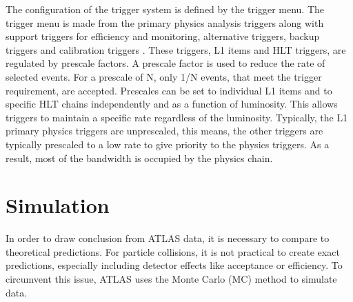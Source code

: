 \indent The configuration of the trigger system is defined by the trigger menu. The trigger menu is made from the primary physics analysis triggers along with support triggers for efficiency and monitoring, alternative triggers, backup triggers and calibration triggers \cite{zurNedden:2238679}. These triggers, L1 items and HLT triggers, are regulated by prescale factors. A prescale factor is used to reduce the rate of selected events. For a prescale of N, only 1/N events, that meet the trigger requirement, are accepted. Prescales can be set to individual L1 items and to specific HLT chains independently and as a function of luminosity. This allows triggers to maintain a specific rate regardless of the luminosity. Typically, the L1 primary physics triggers are unprescaled, this means, the other triggers are typically prescaled to a low rate to give priority to the physics triggers. As a result, most of the bandwidth is occupied by the physics chain. \linebreak
\section{Simulation}
In order to draw conclusion from ATLAS data, it is necessary to compare to theoretical predictions. For particle collisions, it is not practical to create exact predictions, especially including detector effects like acceptance or efficiency. To circumvent this issue, ATLAS uses the Monte Carlo (MC) method to simulate data.\linebreak
\indent 


